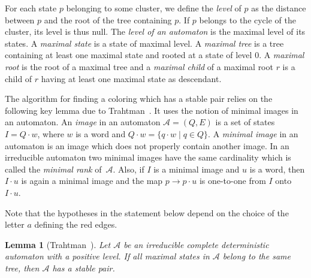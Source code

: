 \documentclass[11pt,a4paper]{article}
\newtheorem{lemma}[theorem]{Lemma}
\def\A{\mathcal{A}}
\begin{document}
For each state $p$ belonging to some cluster, we define the \emph{level} of $p$
as the distance between $p$ and the root of the tree containing
$p$. If $p$ belongs to the cycle of the cluster, its level is thus null.
The \emph{level of an automaton} is the maximal level of its states.
A \emph{maximal state} is a state of maximal level.  
A \emph{maximal tree} is a tree containing at least one maximal state and rooted at
a state of level $0$. 
 A \emph{maximal root} is the root of a maximal
tree and a \emph{maximal child} of a maximal root $r$ is a child of $r$ having at least one maximal state as descendant.





The algorithm for finding a coloring which has a stable pair relies on
the following key lemma due to Trahtman~\cite{Trahtman09}. It uses the
notion of minimal images in an automaton.  An \emph{image} in an
automaton $\A=(Q,E)$ is a set of states $I = Q \cdot w$, where $w$ is
a word and $Q \cdot w = \{q \cdot w \mid q \in Q\}$.  A \emph{minimal
  image} in an automaton is an image which does not properly contain
another image. In an irreducible automaton two minimal images have
the same cardinality which is called the \emph{minimal rank} of~$\A$.
Also, if $I$ is a minimal image and $u$ is a word, then $I \cdot u$ is
again a minimal image and the map $p \rightarrow p \cdot u$ is
one-to-one from $I$ onto $I \cdot u$.

Note that the hypotheses in the statement below depend on the choice
of the letter $a$ defining the red edges.
\begin{lemma}[Trahtman~\cite{Trahtman09}] \label{lemma.sameTree} Let
  $\A$ be an irreducible complete deterministic automaton with a
  positive level.  If all maximal states in $\A$ belong to the same
  tree, then $\A$ has a stable pair.
\end{lemma}
\end{document}
